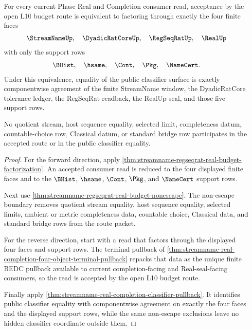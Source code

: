\begin{theorem}
\label{thm:streamname-regseqrat-real-budget-route-exactness}
For every current Phase Real and Completion consumer read, acceptance by the open L10 budget route is equivalent to factoring through exactly the four finite faces
$$
\StreamNameUp,\quad \DyadicRatCoreUp,\quad \RegSeqRatUp,\quad \RealUp
$$
with only the support rows
$$
\BHist,\quad \hsame,\quad \Cont,\quad \Pkg,\quad \NameCert.
$$
Under this equivalence, equality of the public classifier surface is exactly componentwise agreement of the finite StreamName window, the DyadicRatCore tolerance ledger, the RegSeqRat readback, the RealUp seal, and those five support rows.

No quotient stream, host sequence equality, selected limit, completeness datum, countable-choice row, Classical datum, or standard bridge row participates in the accepted route or in the public classifier equality.
\end{theorem}
\begin{proof}
For the forward direction, apply \autoref{thm:streamname-regseqrat-real-budget-factorization}. An accepted consumer read is reduced to the four displayed finite faces and to the $\BHist$, $\hsame$, $\Cont$, $\Pkg$, and $\NameCert$ support rows.

Next use \autoref{thm:streamname-regseqrat-real-budget-nonescape}. The non-escape boundary removes quotient stream equality, host sequence equality, selected limits, ambient or metric completeness data, countable choice, Classical data, and standard bridge rows from the route packet.

For the reverse direction, start with a read that factors through the displayed four faces and support rows. The terminal pullback of \autoref{thm:streamname-real-completion-four-object-terminal-pullback} repacks that data as the unique finite BEDC pullback available to current completion-facing and Real-seal-facing consumers, so the read is accepted by the open L10 budget route.

Finally apply \autoref{thm:streamname-real-completion-classifier-pullback}. It identifies public classifier equality with componentwise agreement on exactly the four faces and the displayed support rows, while the same non-escape exclusions leave no hidden classifier coordinate outside them.
\end{proof}


